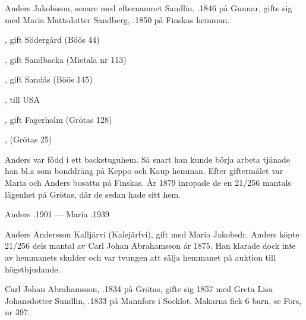 Anders Jakobsson, senare med efternamnet Sandlin, .1846 på Gunnar, gifte sig med Maria Mattsdotter Sandberg, .1850 på Finskas hemman.
\begin{jhchildren}
  \item {}
  \item {}, gift Södergård (Böös 44)
  \item {}, gift Sandbacka (Mietala nr 113)
  \item {}, gift Sandås (Böös 145)
  \item {}, till USA
  \item {}
  \item {}
  \item {}, gift Fagerholm (Grötas 128)
  \item {}, (Grötas 25)
\end{jhchildren}

Anders var född i ett backstuguhem. Så snart han kunde börja arbeta tjänade han bl.a som bonddräng på Keppo och Kaup hemman. Efter giftermålet var Maria och Anders bosatta på Finskas. År 1879 inropade de en 21/256 mantals lägenhet på Grötas, där de sedan hade sitt hem.

Anders .1901  ---  Maria .1939


Anders Andersson Kalljärvi (Kalejärfvi), gift med Maria Jakobsdr. Anders köpte 21/256 dels mantal av Carl Johan Abrahamsson år 1875. Han klarade dock inte av hemmanets skulder och var tvungen att sälja hemmanet på auktion till högstbjudande.\jhvspace{}


Carl Johan Abrahamsson, .1834 på Grötas, gifte sig 1857 med Greta Lisa Johansdotter Sundlin, .1833 på Mannfors i Socklot. Makarna fick 6 barn, se Fors, nr 397.

